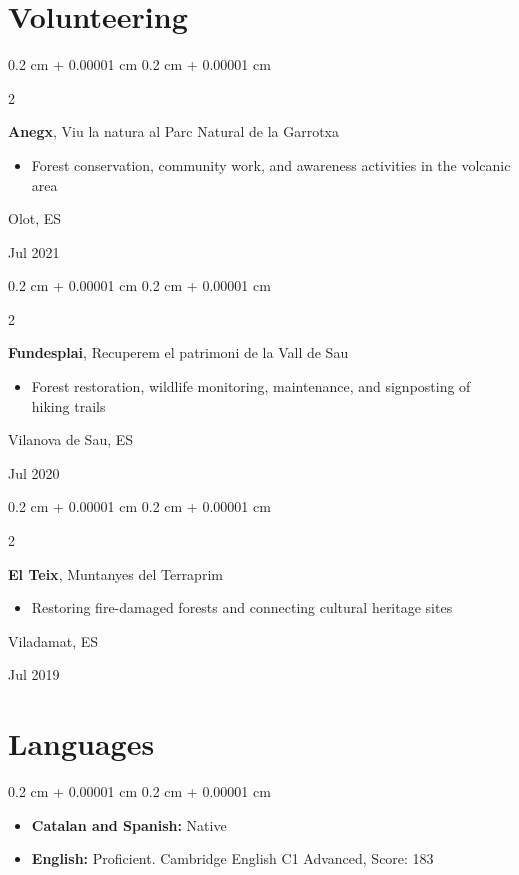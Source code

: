 \documentclass[10pt, letterpaper]{article}
\newenvironment{highlightsforbulletentries}{
    \begin{itemize}[
        topsep=0.10 cm,
        parsep=0.10 cm,
        partopsep=0pt,
        itemsep=0pt,
        leftmargin=10pt
    ]
}{
    \end{itemize}
} %
\newenvironment{onecolentry}{
    \begin{adjustwidth}{
        0.2 cm + 0.00001 cm
    }{
        0.2 cm + 0.00001 cm
    }
}{
    \end{adjustwidth}
} %
\newenvironment{twocolentry}[2][]{
    \onecolentry
    \def\secondColumn{#2}
    \setcolumnwidth{\fill, 4.5 cm}
    \begin{paracol}{2}
}{
    \switchcolumn \raggedleft \secondColumn
    \end{paracol}
    \endonecolentry
} %
\begin{document}
    \section{Volunteering}


        \begin{twocolentry}{
            Olot, ES
            
            Jul 2021
        }
            \textbf{Anegx}, Viu la natura al Parc Natural de la Garrotxa
            \begin{highlightsforbulletentries}
                \item Forest conservation, community work, and awareness activities in the volcanic area
            \end{highlightsforbulletentries}
        \end{twocolentry}

        \vspace{0.2 cm}

        \begin{twocolentry}{
            Vilanova de Sau, ES
            
            Jul 2020
        }
            \textbf{Fundesplai}, Recuperem el patrimoni de la Vall de Sau
            \begin{highlightsforbulletentries}
                \item Forest restoration, wildlife monitoring, maintenance, and signposting of hiking trails
            \end{highlightsforbulletentries}
        \end{twocolentry}

        \vspace{0.2 cm}

        \begin{twocolentry}{
            Viladamat, ES
            
            Jul 2019
        }
            \textbf{El Teix}, Muntanyes del Terraprim
            \begin{highlightsforbulletentries}
                \item Restoring fire-damaged forests and connecting cultural heritage sites
            \end{highlightsforbulletentries}
        \end{twocolentry}
            

    \section{Languages}
        \begin{onecolentry}
            \begin{highlightsforbulletentries}
                \item \textbf{Catalan and Spanish:} Native
                \item \textbf{English:} Proficient. Cambridge English C1 Advanced, Score: 183
            \end{highlightsforbulletentries}
        \end{onecolentry}
\end{document}
